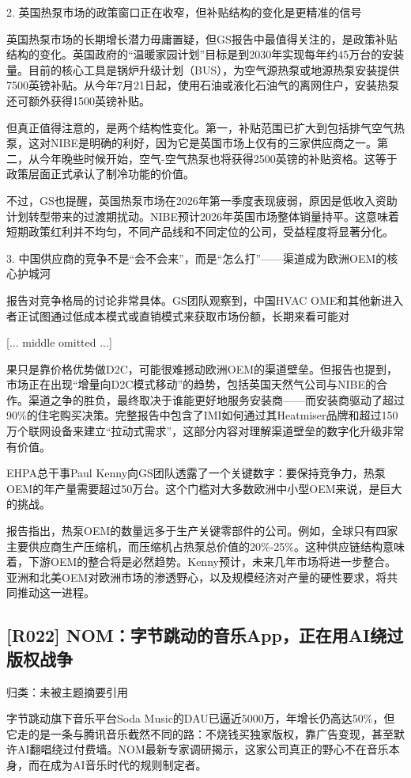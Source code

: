 \documentclass[11pt]{ctexart}
\begin{document}
2. 英国热泵市场的政策窗口正在收窄，但补贴结构的变化是更精准的信号

英国热泵市场的长期增长潜力毋庸置疑，但GS报告中最值得关注的，是政策补贴结构的变化。英国政府的“温暖家园计划”目标是到2030年实现每年约45万台的安装量。目前的核心工具是锅炉升级计划（BUS），为空气源热泵或地源热泵安装提供7500英镑补贴。从今年7月21日起，使用石油或液化石油气的离网住户，安装热泵还可额外获得1500英镑补贴。

但真正值得注意的，是两个结构性变化。第一，补贴范围已扩大到包括排气空气热泵，这对NIBE是明确的利好，因为它是英国市场上仅有的三家供应商之一。第二，从今年晚些时候开始，空气-空气热泵也将获得2500英镑的补贴资格。这等于政策层面正式承认了制冷功能的价值。

不过，GS也提醒，英国热泵市场在2026年第一季度表现疲弱，原因是低收入资助计划转型带来的过渡期扰动。NIBE预计2026年英国市场整体销量持平。这意味着短期政策红利并不均匀，不同产品线和不同定位的公司，受益程度将显著分化。

3. 中国供应商的竞争不是“会不会来”，而是“怎么打”——渠道成为欧洲OEM的核心护城河

报告对竞争格局的讨论非常具体。GS团队观察到，中国HVAC OME和其他新进入者正试图通过低成本模式或直销模式来获取市场份额，长期来看可能对

[... middle omitted ...]

果只是靠价格优势做D2C，可能很难撼动欧洲OEM的渠道壁垒。但报告也提到，市场正在出现“增量向D2C模式移动”的趋势，包括英国天然气公司与NIBE的合作。渠道之争的胜负，最终取决于谁能更好地服务安装商——而安装商驱动了超过90\%的住宅购买决策。完整报告中包含了IMI如何通过其Heatmiser品牌和超过150万个联网设备来建立“拉动式需求”，这部分内容对理解渠道壁垒的数字化升级非常有价值。

EHPA总干事Paul Kenny向GS团队透露了一个关键数字：要保持竞争力，热泵OEM的年产量需要超过50万台。这个门槛对大多数欧洲中小型OEM来说，是巨大的挑战。

报告指出，热泵OEM的数量远多于生产关键零部件的公司。例如，全球只有四家主要供应商生产压缩机，而压缩机占热泵总价值的20\%-25\%。这种供应链结构意味着，下游OEM的整合将是必然趋势。Kenny预计，未来几年市场将进一步整合。亚洲和北美OEM对欧洲市场的渗透野心，以及规模经济对产量的硬性要求，将共同推动这一进程。

\subsection{[R022] NOM：字节跳动的音乐App，正在用AI绕过版权战争}
{\small\color{refgray}归类：未被主题摘要引用}

字节跳动旗下音乐平台Soda Music的DAU已逼近5000万，年增长仍高达50\%，但它走的是一条与腾讯音乐截然不同的路：不烧钱买独家版权，靠广告变现，甚至默许AI翻唱绕过付费墙。NOM最新专家调研揭示，这家公司真正的野心不在音乐本身，而在成为AI音乐时代的规则制定者。
\end{document}

